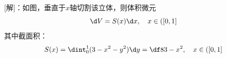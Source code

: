 \begin{center}
	\quad 
\end{center}

[解]：如图，垂直于$x$轴切割该立体，则体积微元
$$\d V=S(x)\d x,\quad x\in([0,1]$$
其中截面积：
$$S(x)=\dint_0^1(3-x^2-y^2)\d y=\df 83-x^2,\quad x\in([0,1]$$

